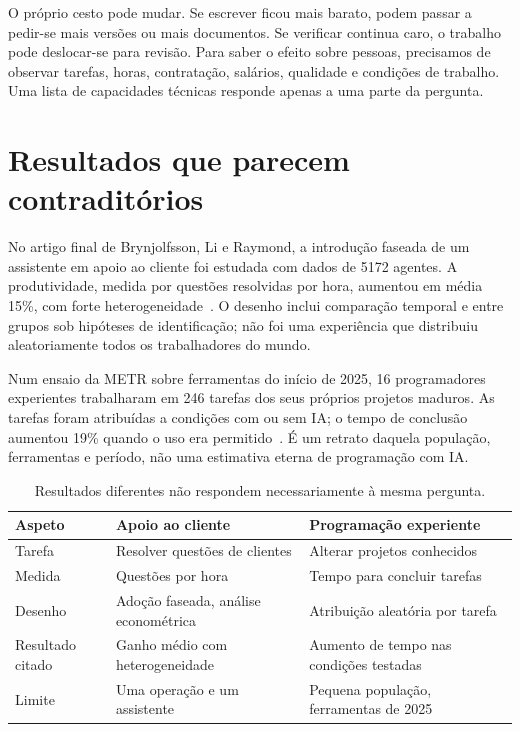 O próprio cesto pode mudar. Se escrever ficou mais barato, podem passar a pedir-se mais versões ou mais documentos. Se verificar continua caro, o trabalho pode deslocar-se para revisão. Para saber o efeito sobre pessoas, precisamos de observar tarefas, horas, contratação, salários, qualidade e condições de trabalho. Uma lista de capacidades técnicas responde apenas a uma parte da pergunta.

\section{Resultados que parecem contraditórios}
No artigo final de Brynjolfsson, Li e Raymond, a introdução faseada de um assistente em apoio ao cliente foi estudada com dados de 5172 agentes. A produtividade, medida por questões resolvidas por hora, aumentou em média 15\%, com forte heterogeneidade~\citep{brynjolfsson2025}. O desenho inclui comparação temporal e entre grupos sob hipóteses de identificação; não foi uma experiência que distribuiu aleatoriamente todos os trabalhadores do mundo.

Num ensaio da METR sobre ferramentas do início de 2025, 16 programadores experientes trabalharam em 246 tarefas dos seus próprios projetos maduros. As tarefas foram atribuídas a condições com ou sem IA; o tempo de conclusão aumentou 19\% quando o uso era permitido~\citep{metr2025}. É um retrato daquela população, ferramentas e período, não uma estimativa eterna de programação com IA.

\begin{table}[htbp]
\small
\begin{tabularx}{\textwidth}{@{}lXX@{}}
\toprule
Aspeto & Apoio ao cliente & Programação experiente \\
\midrule
Tarefa & Resolver questões de clientes & Alterar projetos conhecidos \\
Medida & Questões por hora & Tempo para concluir tarefas \\
Desenho & Adoção faseada, análise econométrica & Atribuição aleatória por tarefa \\
Resultado citado & Ganho médio com heterogeneidade & Aumento de tempo nas condições testadas \\
Limite & Uma operação e um assistente & Pequena população, ferramentas de 2025 \\
\bottomrule
\end{tabularx}
\caption{Resultados diferentes não respondem necessariamente à mesma pergunta.}
\end{table}

